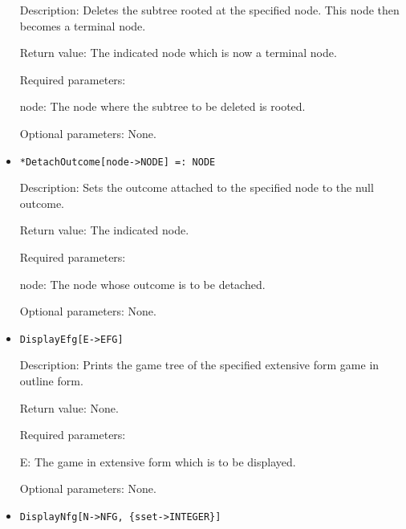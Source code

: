 \begin{itemize}
\bd
\item
[Description:] Deletes the subtree rooted at the specified node.  This
node then becomes a terminal node.
\item
[Return value:] The indicated node which is now a terminal node.
\item
[Required parameters:]\hfil\null

\bd
\item  
[node:] The node where the subtree to be deleted is rooted.
\ed

\item
[Optional parameters:] None.
\ed

\item
\protect \large \begin{verbatim}
*DetachOutcome[node->NODE] =: NODE
\end{verbatim}\normalsize

\bd
\item
[Description:] Sets the outcome attached to the specified node to the
null outcome.
\item   
[Return value:] The indicated node.
\item
[Required parameters:]\hfil\null

\bd
\item	
[node:] The node whose outcome is to be detached.
\ed

\item
[Optional parameters:] None.
\ed

\item
\protect \large \begin{verbatim}
DisplayEfg[E->EFG]
\end{verbatim}\normalsize

\bd
\item
[Description:] Prints the game tree of the specified extensive form
game in outline form.
\item
[Return value:] None.
\item
[Required parameters:]\hfil\null

\bd
\item
[E:] The game in extensive form which is to be displayed.
\ed

\item
[Optional parameters:] None.
\ed

\item
\protect \large \begin{verbatim}
DisplayNfg[N->NFG, {sset->INTEGER}]
\end{verbatim}\normalsize


\end{itemize}
